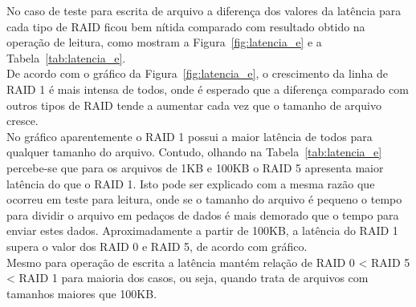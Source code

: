 	
	
	No caso de teste para escrita de arquivo a diferença dos valores da latência para cada tipo de RAID ficou bem nítida comparado com resultado obtido na operação de leitura, como mostram a Figura~\ref{fig:latencia_e} e a Tabela~\ref{tab:latencia_e}.
	\\
	
	De acordo com o gráfico da Figura~\ref{fig:latencia_e}, o crescimento da linha de RAID 1 é mais intensa de todos, onde é esperado que a diferença comparado com outros tipos de RAID tende a aumentar cada vez que o tamanho de arquivo cresce.
	\\
	
	No gráfico aparentemente o RAID 1 possui a maior latência de todos para qualquer tamanho do arquivo. Contudo, olhando na Tabela~\ref{tab:latencia_e} percebe-se que para os arquivos de 1KB e 100KB o RAID 5 apresenta maior latência do que o RAID 1. Isto pode ser explicado com a mesma razão que ocorreu em teste para leitura, onde se o tamanho do arquivo é pequeno o tempo para dividir o arquivo em pedaços de dados é mais demorado que o tempo para enviar estes dados. Aproximadamente a partir de 100KB, a latência do RAID 1 supera o valor dos RAID 0 e RAID 5, de acordo com gráfico. 
	\\
	
	Mesmo para operação de escrita a latência mantém relação de RAID 0 < RAID 5 < RAID 1 para maioria dos casos, ou seja, quando trata de arquivos com tamanhos maiores que 100KB.
	\\
	
